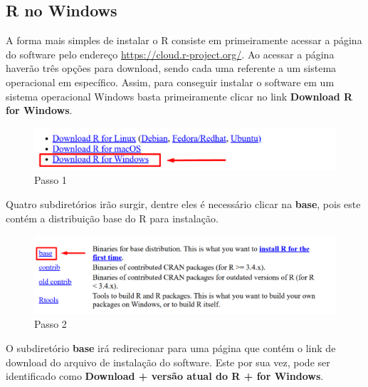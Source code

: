 \documentclass[
  letterpaper,
  DIV=11,
  numbers=noendperiod]{scrreprt}
\begin{document}
\hypertarget{r-no-windows}{%
\subsection{R no Windows}\label{r-no-windows}}

A forma mais simples de instalar o R consiste em primeiramente acessar a
página do software pelo endereço \url{https://cloud.r-project.org/}. Ao
acessar a página haverão três opções para download, sendo cada uma
referente a um sistema operacional em específico. Assim, para conseguir
instalar o software em um sistema operacional Windows basta
primeiramente clicar no link \textbf{Download R for Windows}.

\begin{figure}

{\centering \includegraphics[width=1\textwidth,height=\textheight]{./figuras_tutorialR/install_Windows0.png}

}

\caption{Passo 1}

\end{figure}

Quatro subdiretórios irão surgir, dentre eles é necessário clicar na
\textbf{base}, pois este contém a distribuição base do R para
instalação.

\begin{figure}

{\centering \includegraphics[width=1\textwidth,height=\textheight]{./figuras_tutorialR/install_Windows1.png}

}

\caption{Passo 2}

\end{figure}

O subdiretório \textbf{base} irá redirecionar para uma página que contém
o link de download do arquivo de instalação do software. Este por sua
vez, pode ser identificado como \textbf{Download + versão atual do R +
for Windows}.
\end{document}
